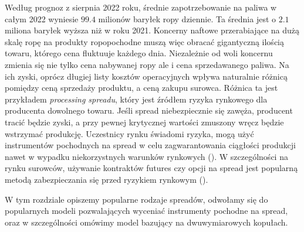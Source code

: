 Według prognoz \cite{PetroleumForecasts} z sierpnia 2022 roku, średnie zapotrzebowanie na paliwa w całym 2022 wyniesie $99.4$ milionów baryłek ropy dziennie. Ta średnia jest o $2.1$ miliona baryłek wyższa niż w roku 2021. Koncerny naftowe przerabiające na dużą skalę ropę na produkty ropopochodne muszą więc obracać gigantyczną ilością towaru, którego cena fluktuuje każdego dnia.
Niezależnie od woli koncernu zmienia się nie tylko cena nabywanej ropy ale i cena sprzedawanego paliwa. Na ich zyski, oprócz długiej listy kosztów operacyjnych wpływa naturalnie różnicą pomiędzy ceną sprzedaży produktu, a ceną zakupu surowca. Różnica ta jest przykładem \emph{processing spreadu}, który jest źródłem ryzyka rynkowego dla producenta dowolnego towaru. Jeśli spread niebezpiecznie się zawęża, producent tracić będzie zyski, a przy pewnej krytycznej wartości zmuszony wręcz będzie wstrzymać produkcję. Uczestnicy rynku świadomi ryzyka, mogą użyć instrumentów pochodnych na spread w celu zagwarantowania ciągłości produkcji nawet w wypadku niekorzystnych warunków rynkowych (\cite{KGHM}). W szczególności na rynku surowców, używanie kontraktów futures czy opcji na spread jest popularną metodą zabezpieczania się przed ryzykiem rynkowym (\cite{spread_hedging}).

W tym rozdziale opiszemy popularne rodzaje spreadów, odwołamy się do popularnych modeli pozwalających wyceniać instrumenty pochodne na spread, oraz w szczególności omówimy model bazujący na dwuwymiarowych kopułach.